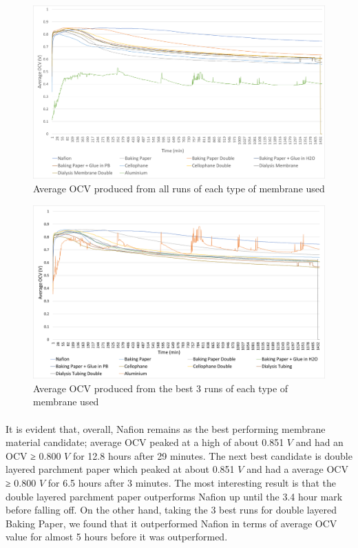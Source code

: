 \documentclass[12pt, twocolumn, a4paper]{article}
\begin{document}
    \begin{figure}
        \centering
        \includegraphics[scale = 0.2]{Averages.png}
        \caption{Average OCV produced from all runs of each type of membrane used}
        \label{fig:averages}
    \end{figure}
    \begin{figure}
        \centering
        \includegraphics[scale=0.2]{best3.png}
        \caption{Average OCV produced from the best 3 runs of each type of membrane used}
        \label{fig:averages}
    \end{figure}
    
    \paragraph{}It is evident that, overall, Nafion\texttrademark{} remains as the best performing membrane material candidate; average OCV peaked at a high of about 0.851 $V$ and had an OCV ≥ 0.800 $V$ for 12.8 hours after 29 minutes. The next best candidate is double layered parchment paper which peaked at about 0.851 $V$ and had a average OCV ≥ 0.800 $V$ for 6.5 hours after 3 minutes. The most interesting result is that the double layered parchment paper outperforms Nafion\texttrademark{} up until the 3.4 hour mark before falling off. On the other hand, taking the 3 best runs for double layered Baking Paper, we found that it outperformed Nafion\texttrademark{} in terms of average OCV value for almost 5 hours before it was outperformed. 
    
\end{document}
